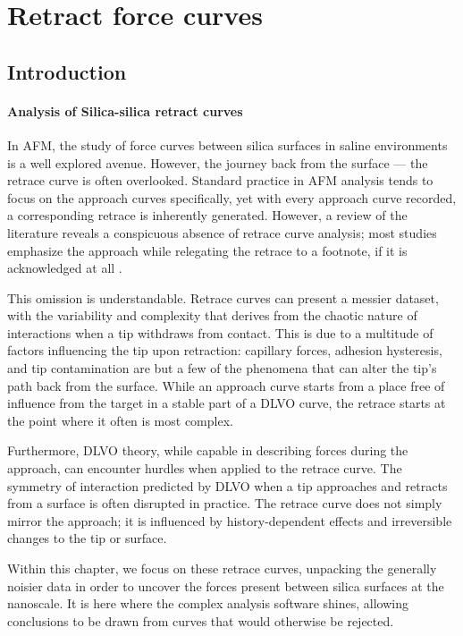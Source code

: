 \chapter{Retract force curves}

\section{Introduction}

\subsubsection{Analysis of Silica-silica retract curves}

In AFM, the study of force curves between silica surfaces in saline environments is a well explored avenue. However, the journey back from the surface — the retrace curve is often overlooked. Standard practice in AFM analysis tends to focus on the approach curves specifically, yet with every approach curve recorded, a corresponding retrace is inherently generated. However, a review of the literature reveals a conspicuous absence of retrace curve analysis; most studies emphasize the approach while relegating the retrace to a footnote, if it is acknowledged at all \cite{Retrace}. %

This omission is understandable. Retrace curves can present a messier dataset, with the variability and complexity that derives from the chaotic nature of interactions when a tip withdraws from contact. This is due to a multitude of factors influencing the tip upon retraction: capillary forces, adhesion hysteresis, and tip contamination are but a few of the phenomena that can alter the tip's path back from the surface. While an approach curve starts from a place free of influence from the target in a stable part of a DLVO curve, the retrace starts at the point where it often is most complex.

Furthermore, DLVO theory, while capable in describing forces during the approach, can encounter hurdles when applied to the retrace curve. The symmetry of interaction predicted by DLVO when a tip approaches and retracts from a surface is often disrupted in practice. The retrace curve does not simply mirror the approach; it is influenced by history-dependent effects and irreversible changes to the tip or surface.

Within this chapter, we focus on these retrace curves, unpacking the generally noisier data in order to uncover the forces present between silica surfaces at the nanoscale. It is here where the complex analysis software shines, allowing conclusions to be drawn from curves that would otherwise be rejected.

